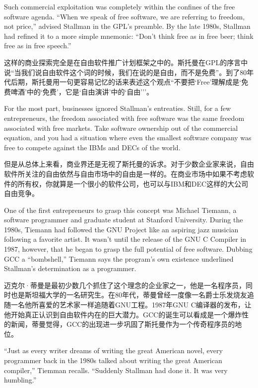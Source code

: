 \ifdefined\eng
Such commercial exploitation was completely within the confines of the free software agenda. ``When we speak of free software, we are referring to freedom, not price,'' advised Stallman in the GPL's preamble. By the late 1980s, Stallman had refined it to a more simple mnemonic: ``Don't think free as in free beer; think free as in free speech.''
\fi

\ifdefined\chs
这样的商业探索完全是在自由软件推广计划框架之中的。斯托曼在GPL的序言中说``当我们说自由软件这个词的时候，我们在说的是自由，而不是免费''。到了80年代后期，斯托曼用一句更容易记忆的话来表述这个观点``不要把`Free'理解成是`免费啤酒'中的`免费'，它是`自由演讲'中的`自由'''。
\fi

\ifdefined\eng
For the most part, businesses ignored Stallman's entreaties. Still, for a few entrepreneurs, the freedom associated with free software was the same freedom associated with free markets. Take software ownership out of the commercial equation, and you had a situation where even the smallest software company was free to compete against the IBMs and DECs of the world.
\fi

\ifdefined\chs
但是从总体上来看，商业界还是无视了斯托曼的诉求。对于少数企业家来说，自由软件所关注的自由依然与自由市场中的自由是一样的。在商业市场中如果不考虑软件的所有权，你就算是一个很小的软件公司，也可以与IBM和DEC这样的大公司自由竞争。
\fi

\ifdefined\eng
One of the first entrepreneurs to grasp this concept was Michael Tiemann, a software programmer and graduate student at Stanford University. During the 1980s, Tiemann had followed the GNU Project like an aspiring jazz musician following a favorite artist. It wasn't until the release of the GNU C Compiler in 1987, however, that he began to grasp the full potential of free software. Dubbing GCC a ``bombshell,'' Tiemann says the program's own existence underlined Stallman's determination as a programmer.
\fi

\ifdefined\chs
迈克尔·蒂曼是最初少数几个抓住了这个理念的企业家之一，他是一名程序员，同时也是斯坦福大学的一名研究生。在80年代，蒂曼曾经一度像一名爵士乐发烧友追随一名他所喜爱的艺术家一样追随着GNU工程。1987年GNU C编译器的发布，让他开始真正认识到自由软件内在的巨大潜力。GCC的诞生可以看成是一个爆炸性的新闻，蒂曼觉得，GCC的出现进一步巩固了斯托曼作为一个传奇程序员的地位。
\fi

\ifdefined\eng
``Just as every writer dreams of writing the great American novel, every programmer back in the 1980s talked about writing the great American compiler,'' Tiemman recalls. ``Suddenly Stallman had done it. It was very humbling.''
\fi

